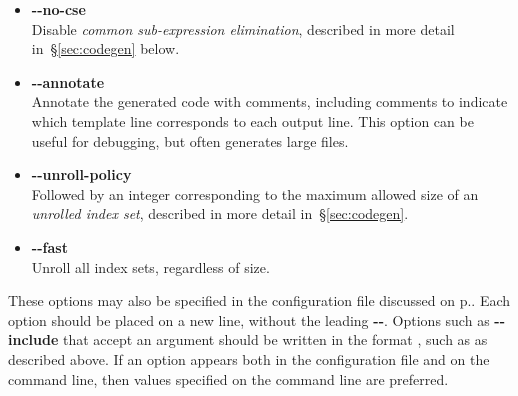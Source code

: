 \documentclass[11pt,a4paper]{article}
\renewcommand{\texttt}[1]{{\ttfamily\fontseries{l}\selectfont{#1}}}
\newcommand{\file}[1]{\texttt{{#1}}}
\newcommand{\option}[1]{{\ttfamily\bfseries\small #1}}
\begin{document}
\begin{itemize}
    \item \option{{-}{-}no-cse} \\
    Disable \emph{common sub-expression elimination}, described in more detail
    in~\S\ref{sec:codegen} below.
    
    \item \option{{-}{-}annotate} \\
    Annotate the generated code with comments,
    including comments to indicate which
    template line corresponds to each output line.
    This option can be useful for debugging, but often generates large
    files.
    
    \item \option{{-}{-}unroll-policy} \\
    Followed by an integer corresponding to the maximum allowed size of an
    \emph{unrolled index set}, described in more detail in~\S\ref{sec:codegen}.
    
    \item \option{{-}{-}fast} \\
    Unroll all index sets, regardless of size.
\end{itemize}

These options may also be specified in the
\file{\textasciitilde{}/.cpptransport} configuration
file discussed on p.\pageref{page:config-files}.
Each option should be placed on a new line,
without the leading \option{{-}{-}}.
Options such as \option{{-}{-}include} that accept an argument
should be written in the format
\texttt{option = argument},
such as
\texttt{include = /usr/local/share/cpptransport}
as described above.
If an option appears both in the configuration file and on the
command line, then values specified on the command line
are preferred.
\end{document}
